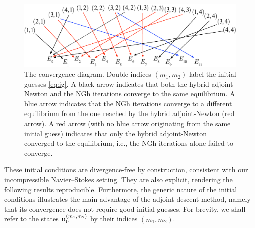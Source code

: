\documentclass{article}
\begin{document}
\begin{figure}
\centering
\includegraphics[width=\textwidth]{conv_diagram}
\caption{
The convergence diagram. Double indices $(m_1,m_2)$ label the initial guesses
\eqref{eq:ig}.
A black arrow indicates that both the hybrid adjoint-Newton and the NGh
iterations converge to the same equilibrium.
A blue arrow indicates that the NGh iterations converge to a different
equilibrium from the one reached by the hybrid adjoint-Newton (red
arrow).
A red arrow (with no blue arrow originating from the same initial guess)
indicates that only the hybrid adjoint-Newton converged to the equilibrium,
i.e., the NGh iterations alone failed to converge.
        }
\label{fig:EQ_diag}
\end{figure}

These initial conditions are divergence-free by construction, consistent with our incompressible
Navier--Stokes setting. They are also explicit, rendering the following results
reproducible. Furthermore, the generic nature of the initial conditions illustrates the main
advantage of the adjoint descent method, namely that its convergence does not require
good initial guesses.
For brevity, we shall refer to the states $\mathbf u_0^{(m_1,m_2)}$ by their
indices $(m_1,m_2)$.
\end{document}
